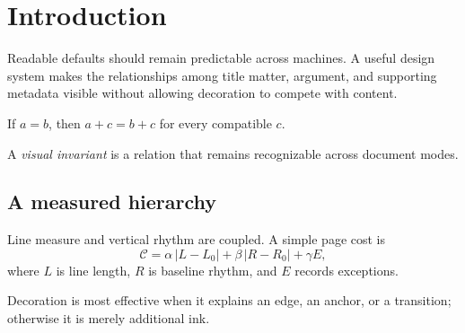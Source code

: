 \documentclass[11pt]{scrartcl}
\begin{document}
\SynapticMakeTitle
\section{Introduction}
Readable defaults should remain predictable across machines. A useful design
system makes the relationships among title matter, argument, and supporting
metadata visible without allowing decoration to compete with content.

\begin{syntheorem}
  If $a=b$, then $a+c=b+c$ for every compatible $c$.
\end{syntheorem}
\begin{syndefinition}
  A \emph{visual invariant} is a relation that remains recognizable across
  document modes.
\end{syndefinition}

\subsection{A measured hierarchy}
Line measure and vertical rhythm are coupled. A simple page cost is
\[
  \mathcal C = \alpha\,\lvert L-L_0\rvert
    + \beta\,\lvert R-R_0\rvert + \gamma E,
\]
where $L$ is line length, $R$ is baseline rhythm, and $E$ records exceptions.

\begin{synremark}
  Decoration is most effective when it explains an edge, an anchor, or a
  transition; otherwise it is merely additional ink.
\end{synremark}
\end{document}
